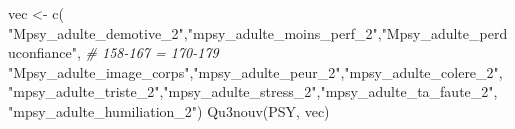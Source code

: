 \documentclass[
]{article}
\newenvironment{Shaded}{\begin{snugshade}}{\end{snugshade}}
\newcommand{\CommentTok}[1]{\textcolor[rgb]{0.56,0.35,0.01}{\textit{#1}}}
\newcommand{\FunctionTok}[1]{\textcolor[rgb]{0.00,0.00,0.00}{#1}}
\newcommand{\NormalTok}[1]{#1}
\newcommand{\OtherTok}[1]{\textcolor[rgb]{0.56,0.35,0.01}{#1}}
\newcommand{\StringTok}[1]{\textcolor[rgb]{0.31,0.60,0.02}{#1}}
\begin{document}
\begin{Shaded}
\begin{Highlighting}[]
\NormalTok{vec }\OtherTok{\textless{}{-}} \FunctionTok{c}\NormalTok{( }\StringTok{"Mpsy\_adulte\_demotive\_2"}\NormalTok{,}\StringTok{"mpsy\_adulte\_moins\_perf\_2"}\NormalTok{,}\StringTok{"Mpsy\_adulte\_perduconfiance"}\NormalTok{,  }\CommentTok{\# 158{-}167 = 170{-}179}
     \StringTok{"Mpsy\_adulte\_image\_corps"}\NormalTok{,}\StringTok{"mpsy\_adulte\_peur\_2"}\NormalTok{,}\StringTok{"mpsy\_adulte\_colere\_2"}\NormalTok{,}
     \StringTok{"mpsy\_adulte\_triste\_2"}\NormalTok{,}\StringTok{"mpsy\_adulte\_stress\_2"}\NormalTok{,}\StringTok{"mpsy\_adulte\_ta\_faute\_2"}\NormalTok{,}
     \StringTok{"mpsy\_adulte\_humiliation\_2"}\NormalTok{)}
\FunctionTok{Qu3nouv}\NormalTok{(PSY, vec)}
\end{Highlighting}
\end{Shaded}
\end{document}
